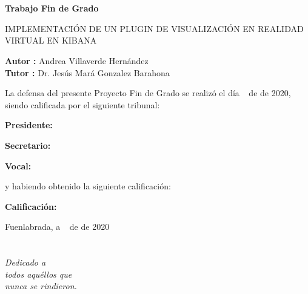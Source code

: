 \documentclass[a4paper, 12pt]{book}
\begin{document}
\newpage
\mbox{}
\thispagestyle{empty} %


\clearpage
{}
\chapter*{}

\vspace{-4cm}
\begin{center}
\large
\textbf{Trabajo Fin de Grado}

\vspace{1cm}
\large
IMPLEMENTACI\'ON DE UN PLUGIN DE VISUALIZACI\'ON EN REALIDAD VIRTUAL EN KIBANA

\vspace{1cm}
\large
\textbf{Autor :} Andrea Villaverde Hern\'andez \\
\textbf{Tutor :} Dr. Jes\'us Mar\'a Gonzalez Barahona

\end{center}

\vspace{1cm}
La defensa del presente Proyecto Fin de Grado se realiz\'o el d\'ia \qquad$\;\,$ de \qquad\qquad\qquad\qquad \newline de 2020, siendo calificada por el siguiente tribunal:

\vspace{0.5cm}
\textbf{Presidente:}

\vspace{1.2cm}
\textbf{Secretario:}

\vspace{1.2cm}
\textbf{Vocal:}

\vspace{1.2cm}
y habiendo obtenido la siguiente calificaci\'on:

\vspace{1cm}
\textbf{Calificaci\'on:}


\vspace{1cm}
\begin{flushright}
Fuenlabrada, a \qquad$\;\,$ de \qquad\qquad\qquad\qquad de 2020
\end{flushright}


\chapter*{}
\begin{flushright}
\textit{Dedicado a \\ 
todos aqu\'ellos que \\
nunca se rindieron.}
\end{flushright}
\end{document}
